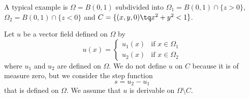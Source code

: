 A typical example is \( \Omega=B(0,1)\) subdivided into \( \Omega_1=B(0,1)\cap\{ z>0 \}\), \( \Omega_2=B(0,1)\cap \{ z<0 \}\) and \( C=\{ (x,y,0)\tq x^2+y^2<1 \}\).


Let \( u\) be a vector field defined on \( \Omega\) by
\begin{equation}
	u(x)=\begin{cases}
		u_1(x) & \text{if } x\in \Omega_1 \\
		u_2(x) & \text{if } x\in \Omega_2
	\end{cases}
\end{equation}
where \( u_1\) and \( u_2\) are defined on \( \Omega\). We do not define \( u\) on \( C\) because it is of measure zero, but we consider the step function
\begin{equation}
	s=u_2-u_1
\end{equation}
that is defined on \( \Omega\). We assume that \( u\) is derivable on \( \Omega\setminus C\).


